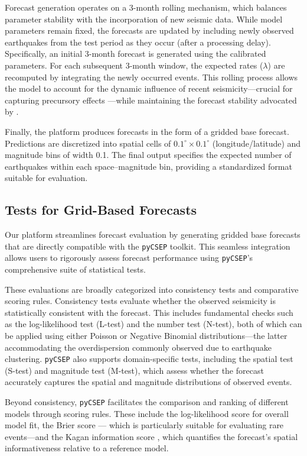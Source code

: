 \documentclass[extra,mreferee]{gji}
\theoremstyle{lemma}
\begin{document}
Forecast generation operates on a 3-month rolling mechanism, which balances parameter stability with the incorporation of new seismic data. While model parameters remain fixed, the forecasts are updated by including newly observed earthquakes from the test period as they occur (after a processing delay). Specifically, an initial 3-month forecast is generated using the calibrated parameters. For each subsequent 3-month window, the expected rates ($\lambda$) are recomputed by integrating the newly occurred events. This rolling process allows the model to account for the dynamic influence of recent seismicity—crucial for capturing precursory effects \cite{rhoades2011}—while maintaining the forecast stability advocated by \cite{christophersen2010}.

Finally, the platform produces forecasts in the form of a gridded base forecast. Predictions are discretized into spatial cells of $0.1^\circ \times 0.1^\circ$ (longitude/latitude) and magnitude bins of width 0.1. The final output specifies the expected number of earthquakes within each space–magnitude bin, providing a standardized format suitable for evaluation.


\subsection{Tests for Grid-Based Forecasts}

Our platform streamlines forecast evaluation by generating gridded base forecasts that are directly compatible with the \texttt{pyCSEP} toolkit. This seamless integration allows users to rigorously assess forecast performance using \texttt{pyCSEP}'s comprehensive suite of statistical tests.

These evaluations are broadly categorized into consistency tests and comparative scoring rules. Consistency tests evaluate whether the observed seismicity is statistically consistent with the forecast. This includes fundamental checks such as the log-likelihood test (L-test) and the number test (N-test), both of which can be applied using either Poisson or Negative Binomial distributions—the latter accommodating the overdispersion commonly observed due to earthquake clustering. \texttt{pyCSEP} also supports domain-specific tests, including the spatial test (S-test) and magnitude test (M-test), which assess whether the forecast accurately captures the spatial and magnitude distributions of observed events.

Beyond consistency, \texttt{pyCSEP} facilitates the comparison and ranking of different models through scoring rules. These include the log-likelihood score for overall model fit, the Brier score \cite{glenn1950verification} — which is particularly suitable for evaluating rare events—and the Kagan information score \cite{kagan2009testing}, which quantifies the forecast's spatial informativeness relative to a reference model.
\end{document}
